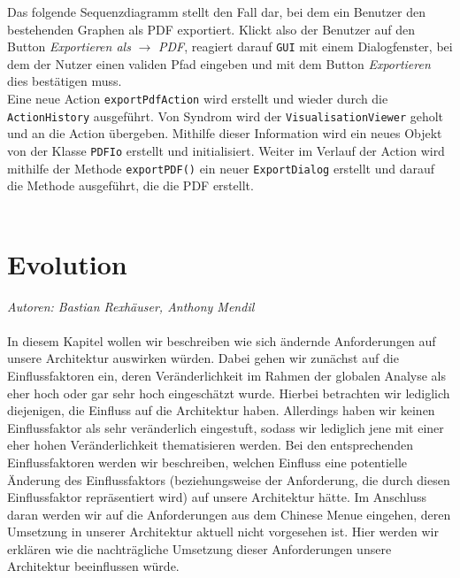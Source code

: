 \documentclass[enabledeprecatedfontcommands,fontsize=11pt,paper=a4,twoside]{scrartcl}
\begin{document}
	Das folgende Sequenzdiagramm stellt den Fall dar, bei dem ein Benutzer den bestehenden Graphen als PDF exportiert. Klickt also der Benutzer auf den Button \textit{Exportieren als} $\rightarrow$ \textit{PDF}, reagiert darauf \texttt{GUI} mit einem Dialogfenster, bei dem der Nutzer einen validen Pfad eingeben und mit dem Button \textit{Exportieren} dies bestätigen muss. \\
	Eine neue Action \texttt{exportPdfAction} wird erstellt und wieder durch die \texttt{ActionHistory} ausgeführt. Von Syndrom wird der \texttt{VisualisationViewer} geholt und an die Action übergeben. Mithilfe dieser Information wird ein neues Objekt von der Klasse \texttt{PDFIo} erstellt und initialisiert. Weiter im Verlauf der Action wird mithilfe der Methode \texttt{exportPDF()} ein neuer \texttt{ExportDialog} erstellt und darauf die Methode ausgeführt, die die PDF erstellt.\\ \\
	
	
	
	
	\newpage
	\section{Evolution}
	\label{sec:evolution}
	\emph{Autoren: Bastian Rexhäuser, Anthony Mendil}\\\\
	In diesem Kapitel wollen wir beschreiben wie sich ändernde Anforderungen auf unsere Architektur auswirken würden. Dabei gehen wir zunächst auf die Einflussfaktoren ein, deren Veränderlichkeit im Rahmen der globalen Analyse als eher hoch oder gar sehr hoch eingeschätzt wurde. Hierbei betrachten wir lediglich diejenigen, die Einfluss auf die Architektur haben. Allerdings haben wir keinen Einflussfaktor als sehr veränderlich eingestuft, sodass wir lediglich jene mit einer eher hohen Veränderlichkeit thematisieren werden. Bei den entsprechenden Einflussfaktoren werden wir beschreiben, welchen Einfluss eine potentielle Änderung des Einflussfaktors (beziehungsweise der Anforderung, die durch diesen Einflussfaktor repräsentiert wird) auf unsere Architektur hätte. Im Anschluss daran werden wir auf die Anforderungen aus dem Chinese Menue eingehen, deren Umsetzung in unserer Architektur aktuell nicht vorgesehen ist. Hier werden wir erklären wie die nachträgliche Umsetzung dieser Anforderungen unsere Architektur beeinflussen würde. \\ 
	
\end{document}
